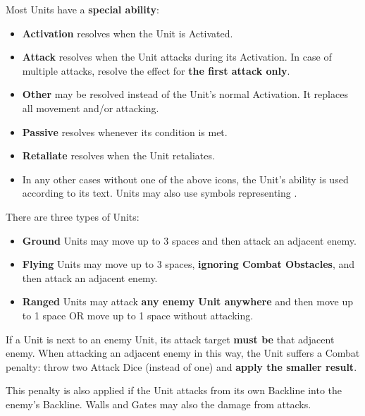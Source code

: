 \begin{multicols}{2}
\bigbreak

Most Units have a \textbf{special ability}:\par
\begin{itemize}[wide]
  \item\textbf{Activation}  resolves when the Unit is Activated.
  \item\textbf{Attack}  resolves when the Unit attacks during its Activation.
    In case of multiple attacks, resolve the effect for \textbf{the first attack only}.
  \item\textbf{Other}  may be resolved instead of the Unit's normal Activation.
    It replaces all movement and/or attacking.
  \item\textbf{Passive}  resolves whenever its condition is met.
  \item\textbf{Retaliate}  resolves when the Unit retaliates.
  \item In any other cases without one of the above icons, the Unit's ability is used according to its text.
    Units may also use symbols representing .
\end{itemize}

\vspace*{\fill}

\columnbreak

There are three types of Units:
\begin{itemize}
  \item \textbf{Ground}  Units may move up to 3 spaces and then attack an adjacent enemy.
  \item \textbf{Flying}  Units may move up to 3 spaces, \textbf{ignoring Combat Obstacles}, and then attack an adjacent enemy.
  \item \textbf{Ranged}  Units may attack \textbf{any enemy Unit anywhere} and then move up to 1 space OR move up to 1 space without attacking.
\end{itemize}
If a  Unit is next to an enemy Unit, its attack target \textbf{must be} that adjacent enemy.
When attacking an adjacent enemy in this way, the  Unit suffers a Combat penalty: throw two Attack Dice (instead of one) and \textbf{apply the smaller result}.\par
This penalty is also applied if the  Unit attacks from its own Backline into the enemy's Backline.
Walls and Gates may also  the damage from   attacks.


\end{multicols}
